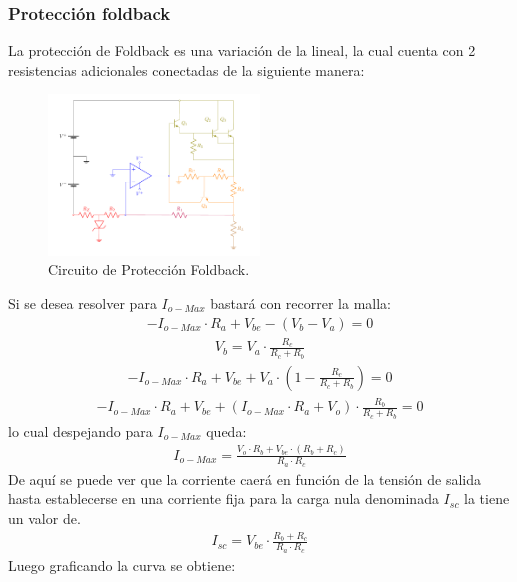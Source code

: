 \subsubsection{Protección foldback}
La protección de Foldback es una variación de la lineal, la cual cuenta con 2 resistencias adicionales conectadas de la siguiente manera:
\begin{figure}[H]
\centering
	\includegraphics[width=0.5\textwidth, page=2]{ImagenesEjercicio2/Regulador.pdf}
	\caption{Circuito de Protección Foldback.}
	\label{fig:circuitofoldback}
\end{figure}
Si se desea resolver para $I_{o-Max}$ bastará con recorrer la malla:
\begin{align}
-I_{o-Max} \cdot R_a + V_{be} - (V_b-V_a)=0
\end{align}
\begin{align}
V_b=V_a \cdot \frac{R_c}{R_c+R_b}
\end{align}
\begin{align}
-I_{o-Max} \cdot R_a + V_{be} + V_a \cdot (1-\frac{R_c}{R_c+R_b})=0
\end{align}
\begin{align}
-I_{o-Max} \cdot R_a + V_{be} + (I_{o-Max} \cdot R_a +V_o) \cdot \frac{R_b}{R_c+R_b}=0
\end{align}
lo cual despejando para $I_{o-Max}$ queda:
\begin{align}
I_{o-Max}=  \frac{V_o \cdot R_b + V_{be}\cdot (R_b+R_c)}{R_a \cdot R_c}
\label{eq:Imaxfoldback}
\end{align}
De aquí se puede ver que la corriente caerá en función de la tensión de salida hasta establecerse en una corriente fija para la carga nula denominada $I_{sc}$ la tiene un valor de.
\begin{align}
I_{sc} = V_{be} \cdot \frac{R_b+R_c}{R_a \cdot R_c}
\end{align}
Luego graficando la curva se obtiene:
